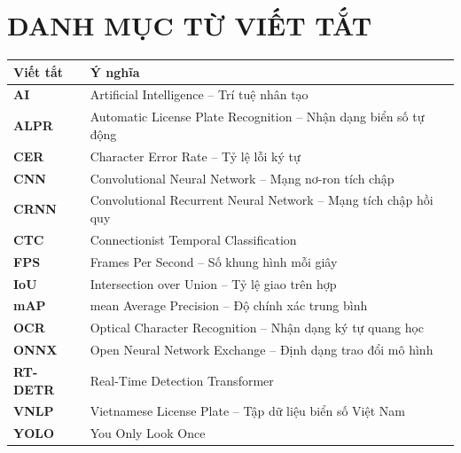\chapter*{DANH MỤC TỪ VIẾT TẮT}

\begin{center}
\begin{tabularx}{\textwidth}{|>{\bfseries}p{2.6cm}|X|}
\hline
\textbf{Viết tắt} & \textbf{Ý nghĩa} \\
\hline
AI & Artificial Intelligence -- Trí tuệ nhân tạo \\
ALPR & Automatic License Plate Recognition -- Nhận dạng biển số tự động \\
CER & Character Error Rate -- Tỷ lệ lỗi ký tự \\
CNN & Convolutional Neural Network -- Mạng nơ-ron tích chập \\
CRNN & Convolutional Recurrent Neural Network -- Mạng tích chập hồi quy \\
CTC & Connectionist Temporal Classification \\
FPS & Frames Per Second -- Số khung hình mỗi giây \\
IoU & Intersection over Union -- Tỷ lệ giao trên hợp \\
mAP & mean Average Precision -- Độ chính xác trung bình \\
OCR & Optical Character Recognition -- Nhận dạng ký tự quang học \\
ONNX & Open Neural Network Exchange -- Định dạng trao đổi mô hình \\
RT-DETR & Real-Time Detection Transformer \\
VNLP & Vietnamese License Plate -- Tập dữ liệu biển số Việt Nam \\
YOLO & You Only Look Once \\
\hline
\end{tabularx}
\end{center}
